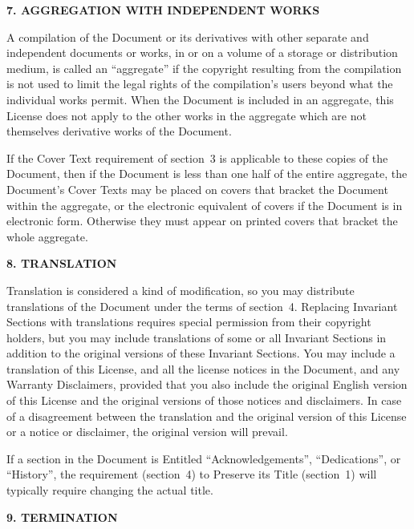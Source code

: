 \documentclass[]{report}
\theoremstyle{definition}
\theoremstyle{remark}
\theoremstyle{plain}
\numberwithin{equation}{chapter}
\begin{document}
\begin{multicols*}{2}
\begin{center}
	{\footnotesize\bf 7. AGGREGATION WITH INDEPENDENT WORKS\par}
\end{center}


A compilation of the Document or its derivatives with other separate
and independent documents or works, in or on a volume of a storage or
distribution medium, is called an ``aggregate'' if the copyright
resulting from the compilation is not used to limit the legal rights
of the compilation's users beyond what the individual works permit.
When the Document is included in an aggregate, this License does not
apply to the other works in the aggregate which are not themselves
derivative works of the Document.

If the Cover Text requirement of section~3 is applicable to these
copies of the Document, then if the Document is less than one half of
the entire aggregate, the Document's Cover Texts may be placed on
covers that bracket the Document within the aggregate, or the
electronic equivalent of covers if the Document is in electronic form.
Otherwise they must appear on printed covers that bracket the whole
aggregate.


\begin{center}
	{\footnotesize\bf 8. TRANSLATION\par}
\end{center}


Translation is considered a kind of modification, so you may
distribute translations of the Document under the terms of section~4.
Replacing Invariant Sections with translations requires special
permission from their copyright holders, but you may include
translations of some or all Invariant Sections in addition to the
original versions of these Invariant Sections.  You may include a
translation of this License, and all the license notices in the
Document, and any Warranty Disclaimers, provided that you also include
the original English version of this License and the original versions
of those notices and disclaimers.  In case of a disagreement between
the translation and the original version of this License or a notice
or disclaimer, the original version will prevail.

If a section in the Document is Entitled ``Acknowledgements'',
``Dedications'', or ``History'', the requirement (section~4) to Preserve
its Title (section~1) will typically require changing the actual
title.


\begin{center}
	{\footnotesize\bf 9. TERMINATION\par}
\end{center}



\end{multicols*}
\end{document}
